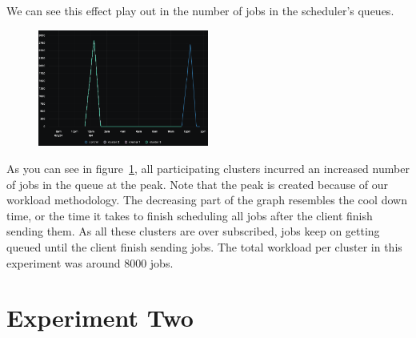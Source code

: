 We can see this effect play out in the number of jobs in the scheduler's queues.
\begin{figure}[H]
  \begin{center}
    \includegraphics[width=0.5\textwidth]{./figures/experiment-one/jobs-in-queue.png}
  \end{center}
  \caption{}\label{fig:exp-1-jobs-in-queue}
\end{figure}

As you can see in figure~\ref{fig:exp-1-jobs-in-queue}, all participating
clusters incurred an increased number of jobs in the queue at the peak. Note
that the peak is created because of our workload methodology. The decreasing
part of the graph resembles the cool down time, or the time it takes to finish
scheduling all jobs after the client finish sending them. As all these clusters
are over subscribed, jobs keep on getting queued until the client finish
sending jobs. The total workload per cluster in this experiment was around 8000
jobs. 

\section{Experiment Two}

\begin{center}
\end{center}

